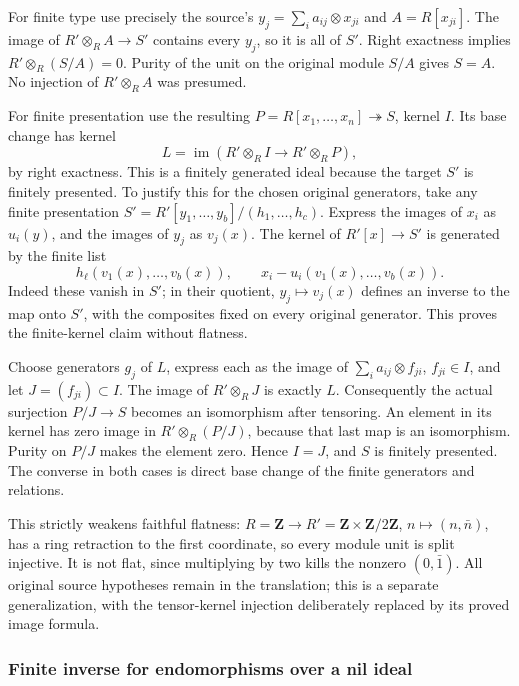For finite type use precisely the source's \(y_j=\sum_i a_{ij}\otimes x_{ji}\) and \(A=R[x_{ji}]\). The image of \(R'\otimes_R A\to S'\) contains every \(y_j\), so it is all of \(S'\). Right exactness implies \(R'\otimes_R(S/A)=0\). Purity of the unit on the original module \(S/A\) gives \(S=A\). No injection of \(R'\otimes_R A\) was presumed.

For finite presentation use the resulting \(P=R[x_1,\ldots,x_n]\twoheadrightarrow S\), kernel \(I\). Its base change has kernel \[
L=\operatorname{im}(R'\otimes_R I\to R'\otimes_R P),
\] by right exactness. This is a finitely generated ideal because the target \(S'\) is finitely presented. To justify this for the chosen original generators, take any finite presentation \(S'=R'[y_1,\ldots,y_b]/(h_1,\ldots,h_c)\). Express the images of \(x_i\) as \(u_i(y)\), and the images of \(y_j\) as \(v_j(x)\). The kernel of \(R'[x]\to S'\) is generated by the finite list \[
h_\ell(v_1(x),\ldots,v_b(x)),\qquad x_i-u_i(v_1(x),\ldots,v_b(x)).
\] Indeed these vanish in \(S'\); in their quotient, \(y_j\mapsto v_j(x)\) defines an inverse to the map onto \(S'\), with the composites fixed on every original generator. This proves the finite-kernel claim without flatness.

Choose generators \(g_j\) of \(L\), express each as the image of \(\sum_i a_{ij}\otimes f_{ji}\), \(f_{ji}\in I\), and let \(J=(f_{ji})\subset I\). The image of \(R'\otimes_R J\) is exactly \(L\). Consequently the actual surjection \(P/J\to S\) becomes an isomorphism after tensoring. An element in its kernel has zero image in \(R'\otimes_R(P/J)\), because that last map is an isomorphism. Purity on \(P/J\) makes the element zero. Hence \(I=J\), and \(S\) is finitely presented. The converse in both cases is direct base change of the finite generators and relations.

This strictly weakens faithful flatness: \(R=\mathbf Z\to R'=\mathbf Z\times\mathbf Z/2\mathbf Z\), \(n\mapsto(n,\bar n)\), has a ring retraction to the first coordinate, so every module unit is split injective. It is not flat, since multiplying by two kills the nonzero \((0,\bar1)\). All original source hypotheses remain in the translation; this is a separate generalization, with the tensor-kernel injection deliberately replaced by its proved image formula.

\subsubsection{Finite inverse for endomorphisms over a nil ideal}\label{finite-inverse-for-endomorphisms-over-a-nil-ideal}

